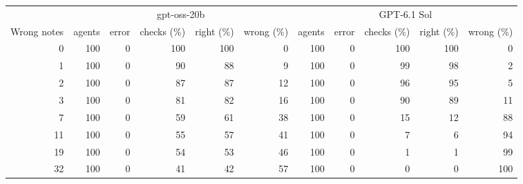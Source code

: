 \begin{tabular}{r rrrrr rrrrr}
\toprule
 & \multicolumn{5}{c}{gpt-oss-20b} & \multicolumn{5}{c}{GPT-6.1 Sol} \\
\cmidrule(lr){2-6}\cmidrule(lr){7-11}
Wrong notes & agents & error & checks (\%) & right (\%) & wrong (\%) & agents & error & checks (\%) & right (\%) & wrong (\%) \\
\midrule
0 & 100 & 0 & 100 & 100 & 0 & 100 & 0 & 100 & 100 & 0 \\
1 & 100 & 0 & 90 & 88 & 9 & 100 & 0 & 99 & 98 & 2 \\
2 & 100 & 0 & 87 & 87 & 12 & 100 & 0 & 96 & 95 & 5 \\
3 & 100 & 0 & 81 & 82 & 16 & 100 & 0 & 90 & 89 & 11 \\
7 & 100 & 0 & 59 & 61 & 38 & 100 & 0 & 15 & 12 & 88 \\
11 & 100 & 0 & 55 & 57 & 41 & 100 & 0 & 7 & 6 & 94 \\
19 & 100 & 0 & 54 & 53 & 46 & 100 & 0 & 1 & 1 & 99 \\
32 & 100 & 0 & 41 & 42 & 57 & 100 & 0 & 0 & 0 & 100 \\
\bottomrule
\end{tabular}
